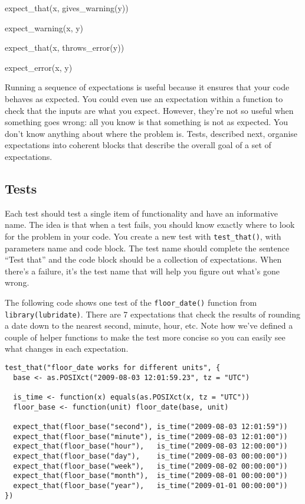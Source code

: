 expect\_that(x, gives\_warning(y))

expect\_warning(x, y)

expect\_that(x, throws\_error(y))

expect\_error(x, y)

Running a sequence of expectations is useful because it ensures that
your code behaves as expected. You could even use an expectation within
a function to check that the inputs are what you expect. However,
they're not so useful when something goes wrong: all you know is that
something is not as expected. You don't know anything about where the
problem is. Tests, described next, organise expectations into coherent
blocks that describe the overall goal of a set of expectations.

\subsection{Tests}

Each test should test a single item of functionality and have an
informative name. The idea is that when a test fails, you should know
exactly where to look for the problem in your code. You create a new
test with \texttt{test\_that()}, with parameters name and code block.
The test name should complete the sentence ``Test that'' and the code
block should be a collection of expectations. When there's a failure,
it's the test name that will help you figure out what's gone wrong.

The following code shows one test of the \texttt{floor\_date()} function
from \texttt{library(lubridate)}. There are 7 expectations that check
the results of rounding a date down to the nearest second, minute, hour,
etc. Note how we've defined a couple of helper functions to make the
test more concise so you can easily see what changes in each
expectation.

\begin{verbatim}
test_that("floor_date works for different units", {
  base <- as.POSIXct("2009-08-03 12:01:59.23", tz = "UTC")

  is_time <- function(x) equals(as.POSIXct(x, tz = "UTC"))
  floor_base <- function(unit) floor_date(base, unit)

  expect_that(floor_base("second"), is_time("2009-08-03 12:01:59"))
  expect_that(floor_base("minute"), is_time("2009-08-03 12:01:00"))
  expect_that(floor_base("hour"),   is_time("2009-08-03 12:00:00"))
  expect_that(floor_base("day"),    is_time("2009-08-03 00:00:00"))
  expect_that(floor_base("week"),   is_time("2009-08-02 00:00:00"))
  expect_that(floor_base("month"),  is_time("2009-08-01 00:00:00"))
  expect_that(floor_base("year"),   is_time("2009-01-01 00:00:00"))
})
\end{verbatim}

